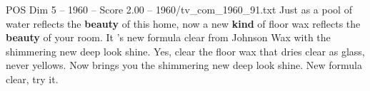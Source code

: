 \begin{textsample}{POS Dim 5 – 1960 – Score 2.00 – 1960/tv\_com\_1960\_91.txt}  \label{ex:f5_pos_089}
Just as a pool of water reflects the \textbf{beauty} of this home, now a new \textbf{kind} of floor wax reflects the \textbf{beauty} of your room.
It 's new formula clear from Johnson Wax with the shimmering new deep look shine.
Yes, clear the floor wax that dries clear as glass, never yellows.
Now brings you the shimmering new deep look shine.
New formula clear, try it.

\end{textsample}
